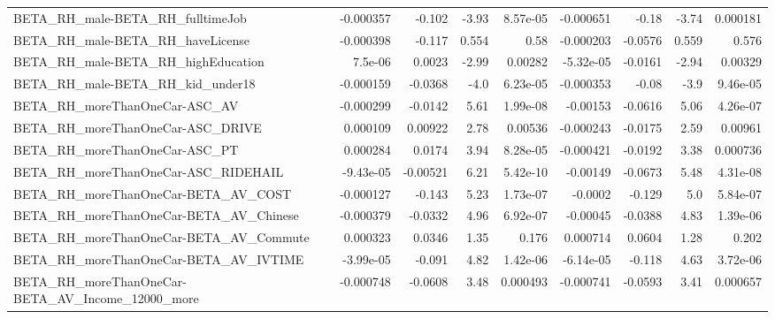 \begin{tabular}{lrrrrrrrr}
BETA\_RH\_male-BETA\_RH\_fulltimeJob                   &   -0.000357 &       -0.102 &     -3.93 & 8.57e-05 &  -0.000651 &       -0.18 &        -3.74 &      0.000181 \\
BETA\_RH\_male-BETA\_RH\_haveLicense                   &   -0.000398 &       -0.117 &     0.554 &     0.58 &  -0.000203 &     -0.0576 &        0.559 &         0.576 \\
BETA\_RH\_male-BETA\_RH\_highEducation                 &     7.5e-06 &       0.0023 &     -2.99 &  0.00282 &  -5.32e-05 &     -0.0161 &        -2.94 &       0.00329 \\
BETA\_RH\_male-BETA\_RH\_kid\_under18                   &   -0.000159 &      -0.0368 &      -4.0 & 6.23e-05 &  -0.000353 &       -0.08 &         -3.9 &      9.46e-05 \\
BETA\_RH\_moreThanOneCar-ASC\_AV                      &   -0.000299 &      -0.0142 &      5.61 & 1.99e-08 &   -0.00153 &     -0.0616 &         5.06 &      4.26e-07 \\
BETA\_RH\_moreThanOneCar-ASC\_DRIVE                   &    0.000109 &      0.00922 &      2.78 &  0.00536 &  -0.000243 &     -0.0175 &         2.59 &       0.00961 \\
BETA\_RH\_moreThanOneCar-ASC\_PT                      &    0.000284 &       0.0174 &      3.94 & 8.28e-05 &  -0.000421 &     -0.0192 &         3.38 &      0.000736 \\
BETA\_RH\_moreThanOneCar-ASC\_RIDEHAIL                &   -9.43e-05 &     -0.00521 &      6.21 & 5.42e-10 &   -0.00149 &     -0.0673 &         5.48 &      4.31e-08 \\
BETA\_RH\_moreThanOneCar-BETA\_AV\_COST                &   -0.000127 &       -0.143 &      5.23 & 1.73e-07 &    -0.0002 &      -0.129 &          5.0 &      5.84e-07 \\
BETA\_RH\_moreThanOneCar-BETA\_AV\_Chinese             &   -0.000379 &      -0.0332 &      4.96 & 6.92e-07 &   -0.00045 &     -0.0388 &         4.83 &      1.39e-06 \\
BETA\_RH\_moreThanOneCar-BETA\_AV\_Commute             &    0.000323 &       0.0346 &      1.35 &    0.176 &   0.000714 &      0.0604 &         1.28 &         0.202 \\
BETA\_RH\_moreThanOneCar-BETA\_AV\_IVTIME              &   -3.99e-05 &       -0.091 &      4.82 & 1.42e-06 &  -6.14e-05 &      -0.118 &         4.63 &      3.72e-06 \\
BETA\_RH\_moreThanOneCar-BETA\_AV\_Income\_12000\_more   &   -0.000748 &      -0.0608 &      3.48 & 0.000493 &  -0.000741 &     -0.0593 &         3.41 &      0.000657 \\

\end{tabular}
